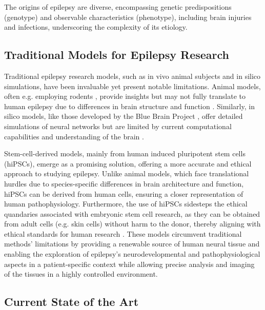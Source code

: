 \documentclass[10pt]{article}
\begin{document}
\begin{sloppypar}
  The origins of epilepsy are diverse, encompassing genetic predispositions (genotype) and observable characteristics (phenotype), including brain injuries and infections, underscoring the complexity of its etiology.

  \subsection{Traditional Models for Epilepsy Research}
  \label{sec:traditional-models-for-epilepsy-research}

  Traditional epilepsy research models, such as in vivo animal subjects and in silico simulations, have been invaluable yet present notable limitations. Animal models, often e.g. employing rodents \citep{wang_animal_2022}, provide insights but may not fully translate to human epilepsy due to differences in brain structure and function \citep{kandratavicius_animal_2014}. Similarly, in silico models, like those developed by the Blue Brain Project \citep{markram_blue_2006}, offer detailed simulations of neural networks but are limited by current computational capabilities and understanding of the brain \citep{mirza_integrative_2016}.

  Stem-cell-derived models, mainly from human induced pluripotent stem cells (hiPSCs), emerge as a promising solution, offering a more accurate and ethical approach to studying epilepsy. Unlike animal models, which face translational hurdles due to species-specific differences in brain architecture and function, hiPSCs can be derived from human cells, ensuring a closer representation of human pathophysiology. Furthermore, the use of hiPSCs sidesteps the ethical quandaries associated with embryonic stem cell research, as they can be obtained from adult cells (e.g. skin cells) without harm to the donor, thereby aligning with ethical standards for human research \citep{takahashi_induction_2006}. These models circumvent traditional methods’ limitations by providing a renewable source of human neural tissue and enabling the exploration of epilepsy’s neurodevelopmental and pathophysiological aspects in a patient-specific context while allowing precise analysis and imaging of the tissues in a highly controlled environment.

  \subsection{Current State of the Art}
  \label{sec:current-state-of-the-art}


\end{sloppypar}
\end{document}
